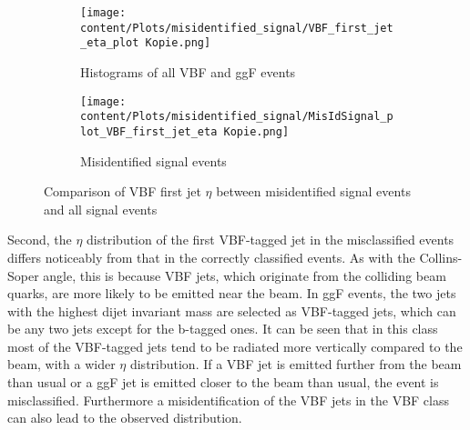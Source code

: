 \begin{figure}[htbp]
    \centering
    \begin{subfigure}{0.45\textwidth}
        \centering
        \texttt{[image: content/Plots/misidentified\_signal/VBF\_first\_jet\_eta\_plot Kopie.png]}
        \caption{Histograms of all VBF and ggF events}
        \label{fig:roc1}
    \end{subfigure}
    \hfill
    \begin{subfigure}{0.45\textwidth}
        \centering
        \texttt{[image: content/Plots/misidentified\_signal/MisIdSignal\_plot\_VBF\_first\_jet\_eta Kopie.png]}
        \caption{Misidentified signal events}
        \label{fig:roc2}
    \end{subfigure}
    \caption{Comparison of VBF first jet $\eta$ between misidentified signal events and all signal events}
    \label{fig:combined_roc}
\end{figure}


Second, the $\eta$ distribution of the first VBF-tagged jet in the misclassified events differs noticeably from that in the correctly classified events. As with the Collins-Soper angle,
this is because VBF jets, which originate from the colliding beam quarks, are more likely to be emitted near the beam. In ggF events, the two jets with the highest dijet invariant mass are selected as
VBF-tagged jets, which can be any two jets except for the b-tagged ones. It can be seen that in this class most of the VBF-tagged jets tend to be radiated more vertically compared to the beam, with a wider $\eta$ distribution. If a VBF jet is emitted
further from the beam than usual or a ggF jet is emitted closer to the beam than usual, the event is misclassified. Furthermore a misidentification of the VBF jets in the VBF class can also lead to the observed distribution.

